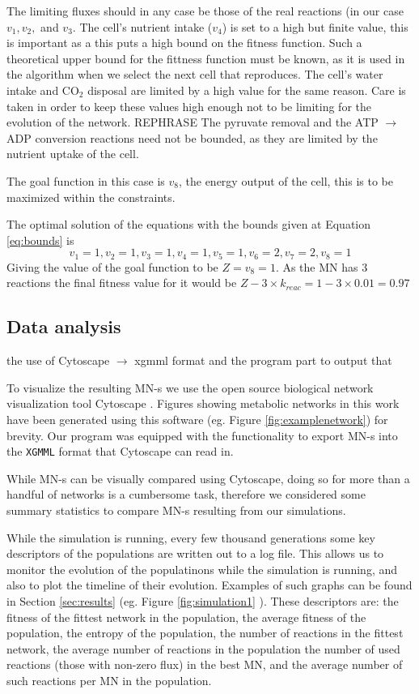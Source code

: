 \documentclass[10pt,a4paper]{article}
\begin{document}
	The limiting fluxes should in any case be those of the real reactions (in our case $v_1, v_2,$ and $v_3$. The cell's nutrient intake ($v_4$) is set to a high but finite value, this is important as a this puts a high bound on the fitness function. Such a theoretical upper bound for the fittness function must be known, as it is used in the algorithm when we select the next cell that reproduces. The cell's water intake and CO$_2$ disposal are limited by a high value for the same reason. Care is taken in order to keep these values high enough not to be limiting for the evolution of the network. REPHRASE The pyruvate removal and the ATP $\rightarrow$ ADP conversion reactions need not be bounded, as they are limited by the nutrient uptake of the cell. 

	The goal function in this case is $v_8$, the energy output of the cell, this is to be maximized within the constraints.

	The optimal solution of the equations with the bounds given at Equation \ref{eq:bounds} is 
	\begin{equation}\label{eq:solution}
		v_1=1 , v_2=1, v_3=1, v_4=1, v_5=1, v_6=2, v_7=2, v_8=1
	\end{equation}
	Giving the value of the goal function to be $Z=v_8=1$. As the MN has $3$ reactions the final fitness value for it would be $Z-3\times k_{reac}=1-3\times 0.01=0.97$
\subsection{Data analysis}
\label{sub:visualization}

the use of Cytoscape $\rightarrow$ xgmml format and the  program part to output that

To visualize the resulting MN-s we use the open source biological network visualization tool Cytoscape \cite{cytoscape}. Figures showing metabolic networks in this work have been generated using this software (eg.  Figure \ref{fig:examplenetwork}) for brevity. Our program was equipped with the functionality to export MN-s into the \texttt{XGMML} format that Cytoscape can read in. 

While MN-s can be visually compared using Cytoscape, doing so for more than a handful of networks is a cumbersome task, therefore we considered some summary statistics to compare MN-s resulting from our simulations.

While the simulation is running, every few thousand generations some key descriptors of the populations are written out to a log file. This allows us to monitor the evolution of the populatinons while the simulation is running, and also to plot the timeline of their evolution. Examples of such graphs can be found in Section \ref{sec:results} (eg. Figure \ref{fig:simulation1} ). These descriptors are: the fitness of the fittest network in the population, the average fitness of the population, the entropy of the population, the number of reactions in the fittest network, the average number of reactions in the population the number of used reactions (those with non-zero flux) in the best MN, and the average number of such reactions per MN in the population. 
\end{document}
